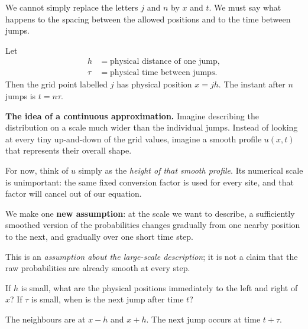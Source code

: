 \documentclass[11pt,a4paper]{article}
\newcommand{\ans}[1]{\par\vspace{4pt}{\small\color{blue}\textbf{Answer.}}\enspace #1}
\begin{document}
We cannot simply replace the letters $j$ and $n$ by $x$ and $t$. We must say what happens to the spacing between the allowed positions and to the time between jumps.

Let
\[
\begin{aligned}
 h&=\text{physical distance of one jump},\\
 \tau&=\text{physical time between jumps}.
\end{aligned}
\]
Then the grid point labelled $j$ has physical position $x=jh$. The instant after $n$ jumps is $t=n\tau$.

\begin{center}
\end{center}

\textbf{The idea of a continuous approximation.} Imagine describing the distribution on a scale much wider than the individual jumps. Instead of looking at every tiny up-and-down of the grid values, imagine a smooth profile $u(x,t)$ that represents their overall shape.

For now, think of $u$ simply as the \emph{height of that smooth profile}. Its numerical scale is unimportant: the same fixed conversion factor is used for every site, and that factor will cancel out of our equation.

\begin{takeaway}[unbreakable]
We make one \textbf{new assumption}: at the scale we want to describe, a sufficiently smoothed version of the probabilities changes gradually from one nearby position to the next, and gradually over one short time step.

This is an \emph{assumption about the large-scale description}; it is not a claim that the raw probabilities are already smooth at every step.
\end{takeaway}

\begin{think}
If $h$ is small, what are the physical positions immediately to the left and right of $x$? If $\tau$ is small, when is the next jump after time $t$?
\ans{The neighbours are at $x-h$ and $x+h$. The next jump occurs at time $t+\tau$.}
\end{think}
\end{document}
